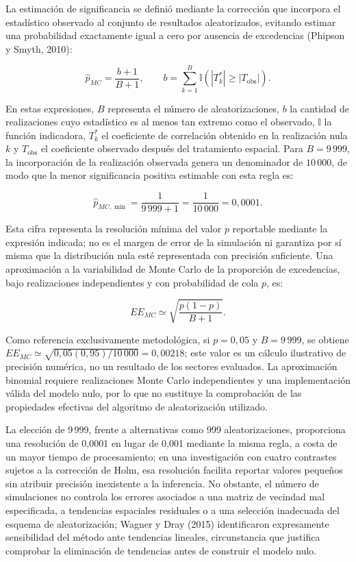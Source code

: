 La estimación de significancia se definió mediante la corrección que incorpora el estadístico observado al conjunto de resultados aleatorizados, evitando estimar una probabilidad exactamente igual a cero por ausencia de excedencias (Phipson y Smyth, 2010):

\[
\widehat{p}_{MC}=\frac{b+1}{B+1}, \qquad
b=\sum_{k=1}^{B}\mathbb{I}\!\left(
\left|T_k^{*}\right|\geq\left|T_{\mathrm{obs}}\right|
\right).
\]

En estas expresiones, \(B\) representa el número de aleatorizaciones, \(b\) la cantidad de realizaciones cuyo estadístico es al menos tan extremo como el observado, \(\mathbb{I}\) la función indicadora, \(T_k^{*}\) el coeficiente de correlación obtenido en la realización nula \(k\) y \(T_{\mathrm{obs}}\) el coeficiente observado después del tratamiento espacial. Para \(B=9\,999\), la incorporación de la realización observada genera un denominador de \(10\,000\), de modo que la menor significancia positiva estimable con esta regla es:

\[
\widehat{p}_{MC,\min}=\frac{1}{9\,999+1}
=\frac{1}{10\,000}=0{,}0001.
\]

Esta cifra representa la resolución mínima del valor \(p\) reportable mediante la expresión indicada; no es el margen de error de la simulación ni garantiza por sí misma que la distribución nula esté representada con precisión suficiente. Una aproximación a la variabilidad de Monte Carlo de la proporción de excedencias, bajo realizaciones independientes y con probabilidad de cola \(p\), es:

\[
EE_{MC}\simeq\sqrt{\frac{p(1-p)}{B+1}}.
\]

Como referencia exclusivamente metodológica, si \(p=0{,}05\) y \(B=9\,999\), se obtiene \(EE_{MC}\simeq\sqrt{0{,}05(0{,}95)/10\,000}=0{,}00218\); este valor es un cálculo ilustrativo de precisión numérica, no un resultado de los sectores evaluados. La aproximación binomial requiere realizaciones Monte Carlo independientes y una implementación válida del modelo nulo, por lo que no sustituye la comprobación de las propiedades efectivas del algoritmo de aleatorización utilizado.

La elección de 9\,999, frente a alternativas como 999 aleatorizaciones, proporciona una resolución de 0,0001 en lugar de 0,001 mediante la misma regla, a costa de un mayor tiempo de procesamiento; en una investigación con cuatro contrastes sujetos a la corrección de Holm, esa resolución facilita reportar valores pequeños sin atribuir precisión inexistente a la inferencia. No obstante, el número de simulaciones no controla los errores asociados a una matriz de vecindad mal especificada, a tendencias espaciales residuales o a una selección inadecuada del esquema de aleatorización; Wagner y Dray (2015) identificaron expresamente sensibilidad del método ante tendencias lineales, circunstancia que justifica comprobar la eliminación de tendencias antes de construir el modelo nulo.


